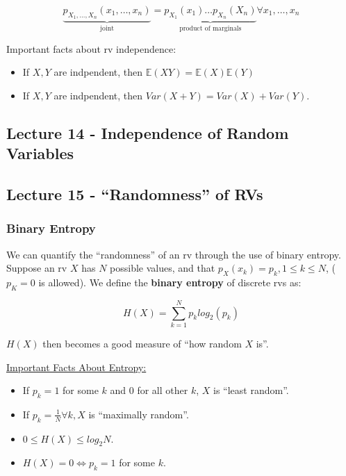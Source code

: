 \documentclass{article}
\begin{document}
\[
  \underbrace{p_{X_1,\dots,X_n}(x_1,\dots,x_n)}_{\text{joint}} =
  \underbrace{p_{X_1}(x_1)\dots p_{X_n}(X_n)}_{\text{product of
      marginals}} \forall x_1, \dots, x_n
\]

Important facts about rv independence:

\begin{itemize}
\item If $X, Y$ are indpendent, then $\mathbb{E}(XY) = \mathbb{E}(X)
  \mathbb{E}(Y)$
  
\item If $X, Y$ are indpendent, then $Var(X+Y) = Var(X) + Var(Y)$.  
\end{itemize}


\medskip\hline
\subsection{Lecture 14 - Independence of Random Variables}


\medskip\hline
\subsection{Lecture 15 - ``Randomness'' of RVs}

\subsubsection{Binary Entropy}

We can quantify the ``randomness'' of an rv through the use of binary
entropy. Suppose an rv $X$ has $N$ possible values, and that $p_X(x_k)
= p_k, 1\leq k\leq N$, ($p_K=0$ is allowed). We define the
\textbf{binary entropy} of discrete rvs as:

\begin{equation}
  \tag{Binary Entroy of RVs}
  \boxed{
    H(X) = \sum_{k=1}^{N} p_klog_2(p_k)
  }
\end{equation}

$H(X)$ then becomes a good measure of ``how random $X$ is''.

\bigskip
\underline{Important Facts About Entropy:}

\begin{itemize}
\item If $p_k = 1$ for some $k$ and $0$ for all other $k$, $X$ is
  ``least random''.

\item If $p_k = \frac{1}{N} \forall k, X$ is ``maximally random''.
  
\item $0 \leq H(X) \leq log_2N$.
  
\item $H(X) = 0 \Leftrightarrow p_k = 1$ for some $k$.
\end{itemize}
\end{document}

